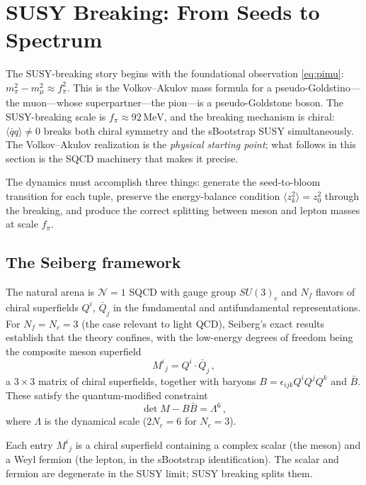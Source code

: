\documentclass[12pt,a4paper]{article}
\newcommand{\MeV}{\,\text{MeV}}
\newcommand{\qqbar}{\langle\bar{q}q\rangle}
\begin{document}
\section{SUSY Breaking: From Seeds to Spectrum}
\label{sec:breaking}

The SUSY-breaking story begins with the foundational observation 
\eqref{eq:pimu}: $m_\pi^2 - m_\mu^2 \approx f_\pi^2$. This is the 
Volkov--Akulov mass formula for a pseudo-Goldstino---the muon---whose 
superpartner---the pion---is a pseudo-Goldstone boson. The SUSY-breaking 
scale is $f_\pi \approx 92\MeV$, and the breaking mechanism is chiral: 
$\qqbar \neq 0$ breaks both chiral symmetry and the sBootstrap SUSY 
simultaneously. The Volkov--Akulov realization is the \emph{physical 
starting point}; what follows in this section is the SQCD machinery 
that makes it precise.

The dynamics must accomplish three things: generate the seed-to-bloom 
transition for each tuple, preserve the energy-balance condition 
$\langle z_k^2\rangle = z_0^2$ through the breaking, and produce 
the correct splitting between meson and lepton masses at scale $f_\pi$.

\subsection{The Seiberg framework}

The natural arena is $\mathcal{N}=1$ SQCD with gauge group $SU(3)_c$ 
and $N_f$ flavors of chiral superfields $Q^i$, $\bar{Q}_j$ in the 
fundamental and antifundamental representations. For $N_f = N_c = 3$ 
(the case relevant to light QCD), Seiberg's exact results 
\cite{Seiberg1995} establish that the theory confines, with the 
low-energy degrees of freedom being the composite meson superfield
\begin{equation}
M^i{}_j = Q^i \cdot \bar{Q}_j\,,
\end{equation}
a $3\times 3$ matrix of chiral superfields, together with baryons 
$B = \epsilon_{ijk}Q^iQ^jQ^k$ and $\bar{B}$. These satisfy the 
quantum-modified constraint
\begin{equation}
\label{eq:seiberg}
\det M - B\bar{B} = \Lambda^{6}\,,
\end{equation}
where $\Lambda$ is the dynamical scale ($2N_c = 6$ for $N_c = 3$).

Each entry $M^i{}_j$ is a chiral superfield containing a complex 
scalar (the meson) and a Weyl fermion (the lepton, in the sBootstrap 
identification). The scalar and fermion are degenerate in the SUSY 
limit; SUSY breaking splits them.
\end{document}
